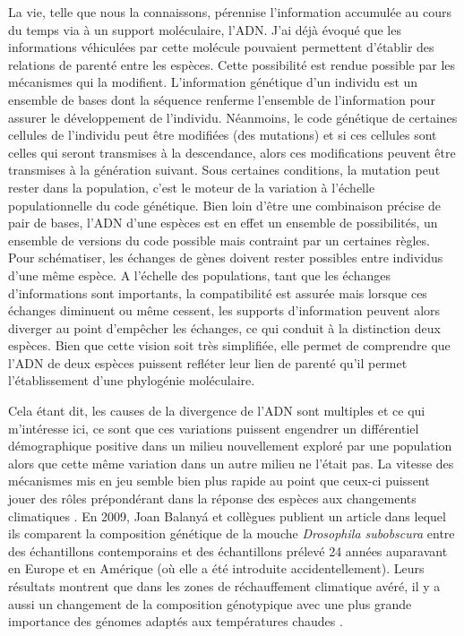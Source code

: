 La vie, telle que nous la connaissons, pérennise l'information accumulée
au cours du temps via à un support moléculaire, l'ADN. J'ai déjà évoqué
que les informations véhiculées par cette molécule pouvaient permettent
d'établir des relations de parenté entre les espèces. Cette possibilité
est rendue possible par les mécanismes qui la modifient. L'information
génétique d'un individu est un ensemble de bases dont la séquence
renferme l'ensemble de l'information pour assurer le développement de
l'individu. Néanmoins, le code génétique de certaines cellules de
l'individu peut être modifiées (des mutations) et si ces cellules sont
celles qui seront transmises à la descendance, alors ces modifications
peuvent être transmises à la génération suivant. Sous certaines
conditions, la mutation peut rester dans la population, c'est le moteur
de la variation à l'échelle populationnelle du code génétique. Bien loin
d'être une combinaison précise de pair de bases, l'ADN d'une espèces est
en effet un ensemble de possibilités, un ensemble de versions du code
possible mais contraint par un certaines règles. Pour schématiser, les
échanges de gènes doivent rester possibles entre individus d'une même
espèce. A l'échelle des populations, tant que les échanges
d'informations sont importants, la compatibilité est assurée mais
lorsque ces échanges diminuent ou même cessent, les supports
d'information peuvent alors diverger au point d'empêcher les échanges,
ce qui conduit à la distinction deux espèces. Bien que cette vision soit
très simplifiée, elle permet de comprendre que l'ADN de deux espèces
puissent refléter leur lien de parenté qu'il permet l'établissement
d'une phylogénie moléculaire.

Cela étant dit, les causes de la divergence de l'ADN sont multiples et
ce qui m'intéresse ici, ce sont que ces variations puissent engendrer un
différentiel démographique positive dans un milieu nouvellement exploré
par une population alors que cette même variation dans un autre milieu
ne l'était pas. La vitesse des mécanismes mis en jeu semble bien plus
rapide au point que ceux-ci puissent jouer des rôles prépondérant dans
la réponse des espèces aux changements climatiques \citep{Lavergne2010}.
En 2009, Joan Balanyá et collègues publient un article dans lequel ils
comparent la composition génétique de la mouche \emph{Drosophila
subobscura} entre des échantillons contemporains et des échantillons
prélevé 24 années auparavant en Europe et en Amérique (où elle a été
introduite accidentellement). Leurs résultats montrent que dans les
zones de réchauffement climatique avéré, il y a aussi un changement de
la composition génotypique avec une plus grande importance des génomes
adaptés aux températures chaudes \citep{Balanya2006}.

